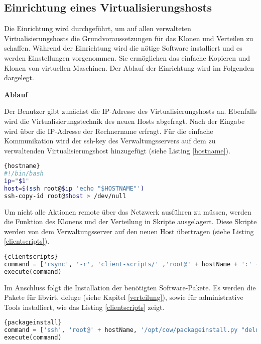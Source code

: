 \subsection{Einrichtung eines Virtualisierungshosts}\label{einrichtung}
Die Einrichtung wird durchgeführt, um auf allen verwalteten Virtualisierungshosts die Grundvoraussetzungen für das Klonen und Verteilen zu schaffen. Während der Einrichtung wird die nötige Software installiert und es werden Einstellungen vorgenommen. Sie ermöglichen das einfache Kopieren und Klonen von virtuellen Maschinen. Der Ablauf der Einrichtung wird im Folgenden dargelegt. 

\textbf{Ablauf}

Der Benutzer gibt zunächst die IP-Adresse des Virtualisierungshosts an. Ebenfalls wird die Virtualisierungstechnik des neuen Hosts abgefragt. Nach der Eingabe wird über die IP-Adresse der Rechnername erfragt. Für die einfache Kommunikation wird der ssh-key des Verwaltungsservers auf dem zu verwaltenden Virtualisierungshost hinzugefügt (siehe Listing \ref{hostname}).
\\
\begin{lstlisting}[caption=Abruf des Rechnernamens und Kopieren des ssh-keys (hostname.sh),language=Bash,label=hostname]{hostname}
#!/bin/bash
ip="$1"
host=$(ssh root@$ip 'echo "$HOSTNAME"')
ssh-copy-id root@$host > /dev/null
\end{lstlisting}

Um nicht alle Aktionen remote über das Netzwerk ausführen zu müssen, werden die Funktion des Klonens und der Verteilung in Skripte ausgelagert. Diese Skripte werden von dem Verwaltungsserver auf den neuen Host übertragen (siehe Listing \ref{clientscripts}).
\\
\begin{lstlisting}[caption=Übertragung der Client-Skripte,language=Python,label=clientscripts]{clientscripts}
command = ['rsync', '-r', 'client-scripts/' ,'root@' + hostName + ':' + binDir]
execute(command)
\end{lstlisting}

Im Anschluss folgt die Installation der benötigten Software-Pakete. Es werden die Pakete für libvirt, deluge (siehe Kapitel \ref{verteilung}), sowie für administrative Tools installiert, wie das Listing \ref{clientscripts} zeigt. 
\\
\begin{lstlisting}[caption=Paketinstallation auf dem Virtualisierungsserver,language=Python,label=packageinstall]{packageinstall}
command = ['ssh', 'root@' + hostName, '/opt/cow/packageinstall.py "deluged deluge-console mktorrent libvirt-bin python-libvirt"' ]
execute(command)
\end{lstlisting}

